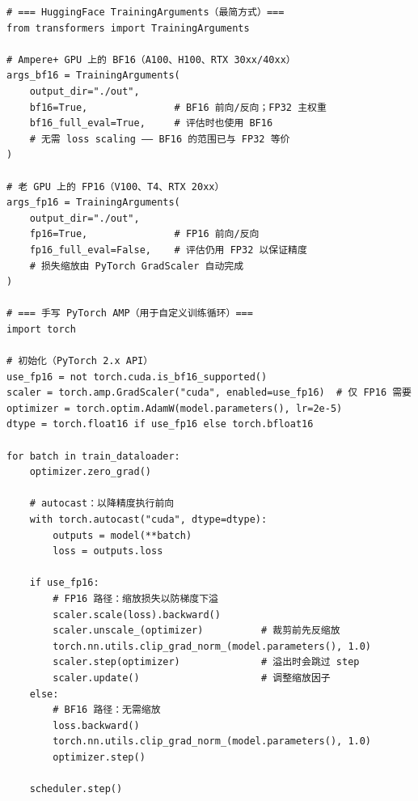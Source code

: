 \begin{lstlisting}[style=pythonstyle, caption={使用 HuggingFace 与手写 PyTorch AMP 实现混合精度训练。}]
# === HuggingFace TrainingArguments（最简方式）===
from transformers import TrainingArguments

# Ampere+ GPU 上的 BF16（A100、H100、RTX 30xx/40xx）
args_bf16 = TrainingArguments(
    output_dir="./out",
    bf16=True,               # BF16 前向/反向；FP32 主权重
    bf16_full_eval=True,     # 评估时也使用 BF16
    # 无需 loss scaling —— BF16 的范围已与 FP32 等价
)

# 老 GPU 上的 FP16（V100、T4、RTX 20xx）
args_fp16 = TrainingArguments(
    output_dir="./out",
    fp16=True,               # FP16 前向/反向
    fp16_full_eval=False,    # 评估仍用 FP32 以保证精度
    # 损失缩放由 PyTorch GradScaler 自动完成
)

# === 手写 PyTorch AMP（用于自定义训练循环）===
import torch

# 初始化（PyTorch 2.x API）
use_fp16 = not torch.cuda.is_bf16_supported()
scaler = torch.amp.GradScaler("cuda", enabled=use_fp16)  # 仅 FP16 需要
optimizer = torch.optim.AdamW(model.parameters(), lr=2e-5)
dtype = torch.float16 if use_fp16 else torch.bfloat16

for batch in train_dataloader:
    optimizer.zero_grad()

    # autocast：以降精度执行前向
    with torch.autocast("cuda", dtype=dtype):
        outputs = model(**batch)
        loss = outputs.loss

    if use_fp16:
        # FP16 路径：缩放损失以防梯度下溢
        scaler.scale(loss).backward()
        scaler.unscale_(optimizer)          # 裁剪前先反缩放
        torch.nn.utils.clip_grad_norm_(model.parameters(), 1.0)
        scaler.step(optimizer)              # 溢出时会跳过 step
        scaler.update()                     # 调整缩放因子
    else:
        # BF16 路径：无需缩放
        loss.backward()
        torch.nn.utils.clip_grad_norm_(model.parameters(), 1.0)
        optimizer.step()

    scheduler.step()
\end{lstlisting}


